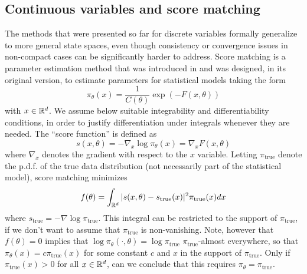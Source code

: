 \subsection{Continuous  variables and score matching}
\label{sec:score.matching}
The methods that were presented so far for discrete variables formally generalize to more general state spaces, even though consistency or convergence issues in non-compact cases can be significantly harder to address. Score matching is a parameter estimation method that was introduced in \cite{hyvarinen2005estimation} and was designed, in its original version, to estimate parameters for statistical models taking the form
\[
\pi_\theta(x) = \frac{1}{C(\theta)}\exp\left(- F(x, \theta)\right)
\]
with $x\in {\mathbb{R}}^d$. We assume below suitable integrability and differentiability conditions, in order to justify differentiation under integrals whenever they are needed.
The ``score function'' is defined as
\[
s(x, \theta) = - \nabla_x \log \pi_\theta(x) = \nabla_x F(x, \theta)
\]
where $\nabla_x$ denotes the gradient with respect to the $x$ variable. Letting $\pi_{\mathrm{true}}$ denote the p.d.f. of the true data distribution (not necessarily part of the statistical model), score matching minimizes
\[
f(\theta) = \int_{{\mathbb{R}}^d} |s(x, \theta) - s_{\mathrm{true}}(x)|^2 \pi_{\mathrm{true}}(x) dx
\]
where $s_{\mathrm{true}} = - \nabla \log \pi_{\mathrm{true}}$.  This integral can be restricted to the support of $\pi_{\mathrm{true}}$, if we don't want to assume that $\pi_{\mathrm{true}}$ is non-vanishing. Note, however that $f(\theta) = 0$ implies that $\log \pi_\theta (\cdot, \theta) = \log \pi_{\mathrm{true}}$ $\pi_{\mathrm{true}}$-almost everywhere, so that $\pi_\theta(x) = c \pi_{\mathrm{true}}(x)$ for some constant $c$ and $x$ in the support of $\pi_{\mathrm{true}}$. Only if $\pi_{\mathrm{true}}(x) > 0$ for all $x\in {\mathbb{R}}^d$, can we conclude that this requires $\pi_\theta = \pi_{\mathrm{true}}$. 

